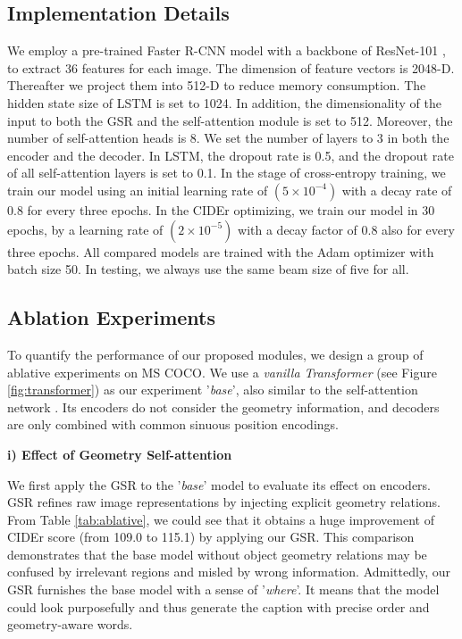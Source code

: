 \documentclass[review]{elsarticle}
\begin{document}
\subsection{Implementation Details}
We employ a pre-trained Faster R-CNN model with a backbone of ResNet-101 \cite{Anderson_2018_CVPR}, to extract 36 features for each image. The dimension of feature vectors is 2048-D. Thereafter we project them into 512-D to reduce memory consumption. The hidden state size of LSTM is set to 1024. In addition, the dimensionality of the input to both the GSR and the self-attention module is set to 512. Moreover, the number of self-attention heads is 8. We set the number of layers to 3 in both the encoder and the decoder. In LSTM, the dropout rate is 0.5, and the dropout rate of all self-attention layers is set to 0.1. In the stage of cross-entropy training, we train our model using an initial learning rate of $(5 \times 10^{-4})$ with a decay rate of 0.8 for every three epochs. In the CIDEr optimizing, we train our model in 30 epochs, by a learning rate of $(2 \times 10^{-5})$ with a decay factor of 0.8 also for every three epochs. All compared models are trained with the Adam optimizer with batch size 50. In testing, we always use the same beam size of five for all.

\subsection{Ablation Experiments}
To quantify the performance of our proposed modules, we design a group of ablative experiments on MS COCO. We use a \emph{vanilla Transformer} (see Figure \ref{fig:transformer}) as our experiment '\emph{base}', also similar to the self-attention network \cite{guo2020normalized}. Its encoders do not consider the geometry information, and decoders are only combined with common sinuous position encodings.

\textbf{i) Effect of Geometry Self-attention}

We first apply the GSR to the '\emph{base}' model to evaluate its effect on encoders. GSR refines raw image representations by injecting explicit geometry relations. From Table \ref{tab:ablative}, we could see that it obtains a huge improvement of CIDEr score (from 109.0 to 115.1) by applying our GSR. This comparison demonstrates that the base model without object geometry relations may be confused by irrelevant regions and misled by wrong information. Admittedly, our GSR furnishes the base model with a sense of '\emph{where}'. It means that the model could look purposefully and thus generate the caption with precise order and geometry-aware words.
\end{document}
